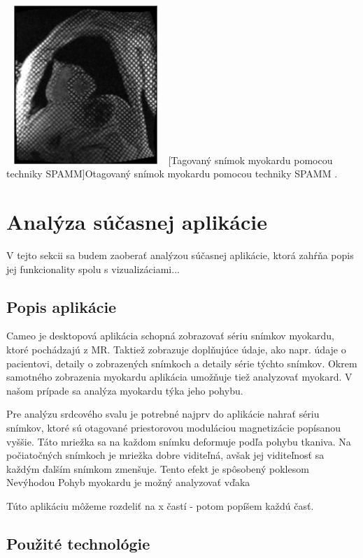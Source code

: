 \begin {center}
        \centering
        \includegraphics[width=6cm, height=6cm]{media/tagged_heart.png}
        [Tagovaný snímok myokardu pomocou techniky SPAMM]{Otagovaný snímok myokardu pomocou techniky SPAMM \cite{spamm_description}.}
\end {center}


\section {Analýza súčasnej aplikácie}

V tejto sekcii sa budem zaoberať analýzou súčasnej aplikácie, ktorá zahŕňa popis jej funkcionality spolu s vizualizáciami...

\subsection {Popis aplikácie}

Cameo je desktopová aplikácia schopná zobrazovať sériu snímkov myokardu, ktoré pochádzajú z MR. Taktiež zobrazuje doplňujúce údaje, ako napr. údaje o pacientovi, detaily o zobrazených snímkoch a detaily série týchto snímkov. Okrem samotného zobrazenia myokardu aplikácia umožňuje tiež analyzovať myokard. V našom prípade sa analýza myokardu týka jeho pohybu.

Pre analýzu srdcového svalu je potrebné najprv do aplikácie nahrať sériu snímkov, ktoré sú otagované priestorovou moduláciou magnetizácie popísanou vyššie. Táto mriežka sa na každom snímku deformuje podľa pohybu tkaniva. Na počiatočných snímkoch je mriežka dobre viditeľná, avšak jej viditeľnosť sa každým ďalším snímkom zmenšuje. Tento efekt je spôsobený poklesom Nevýhodou  Pohyb myokardu je možný analyzovať vďaka 


Túto aplikáciu môžeme rozdeliť na x častí - potom popíšem každú časť.

\subsection {Použité technológie}

